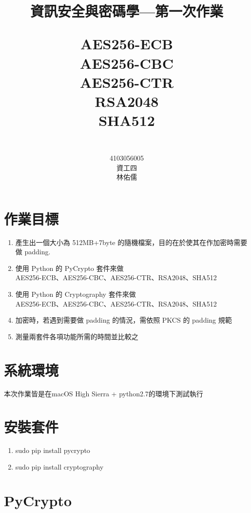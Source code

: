 \documentclass{article}
\title{ 資訊安全與密碼學---第一次作業 \\  \begin{large} AES256-ECB \\ AES256-CBC \\ AES256-CTR \\ RSA2048 \\ SHA512 \\ \end{large} }
\author{\\4103056005 \\ 資工四 \\ 林佑儒}
\date{}
\begin{document}
\maketitle
\newpage
\section{作業目標}
\begin{enumerate}
    \item 產生出一個大小為 512MB+7byte 的隨機檔案，目的在於使其在作加密時需要做 padding.
    \item 使用 Python 的 PyCrypto 套件來做\\AES256-ECB、AES256-CBC、AES256-CTR、RSA2048、SHA512
	\item 使用 Python 的 Cryptography 套件來做\\AES256-ECB、AES256-CBC、AES256-CTR、RSA2048、SHA512
	\item 加密時，若遇到需要做 padding 的情況，需依照 PKCS 的 padding 規範
	\item 測量兩套件各項功能所需的時間並比較之
\end{enumerate}

\section{系統環境}
\quad 本次作業皆是在macOS High Sierra + python2.7的環境下測試執行
\section{安裝套件}
\begin{enumerate}
    \item sudo pip install pycrypto
    \item sudo pip install cryptography
\end{enumerate}
\newpage
\section{PyCrypto}
\end{document}
